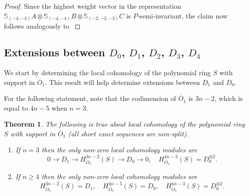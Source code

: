\documentclass[11pt,reqno]{amsart}
\newcommand{\oo}{\otimes}
\newcommand{\bS}{\mathbb{S}}
\newcommand{\ol}[1]{\overline{#1}}
\newtheorem{theorem}{Theorem}[section]
\numberwithin{equation}{section}
\begin{document}
\begin{proof}
Since the highest weight vector in the representation $\bS_{(-4,-4)}A\oo \bS_{(-4,-4)}B\oo \bS_{(-2,-3,-3)}C$ is $P$-semi-invariant, the claim now follows analogously to \cite[Lemma 3.12 and Proposition 3.14]{lHorincz2019categories} %
\end{proof}



\subsection{Extensions between $D_0$, $D_1$, $D_2$, $D_3$, $D_4$} 



We start by determining the local cohomology of the polynomial ring $S$ with support in $\ol{O}_1$. This result will help determine extensions between $D_1$ and $D_0$.

For the following statement, note that the codimension of $\ol{O}_1$ is $3n-2$, which is equal to $4n-5$ when $n=3$.

\begin{theorem}\label{BettiThm}
The following is true about local cohomology of the polynomial ring $S$ with support in $\ol{O}_1$ (all short exact sequences are non-split).

\begin{enumerate}	
\item If $n=3$ then the only non-zero local cohomology modules are 
$$
0 \to D_1 \to H^{3n-2}_{\ol{O}_1}(S)\to D_0\to 0,\quad H^{4n-3}_{\ol{O}_1}(S)=D_0^{\oplus 2}.
$$
\item If $n\geq 4$ then the only non-zero local cohomology modules are
$$
H^{3n-2}_{\ol{O}_1}(S)=D_1,\quad H^{4n-5}_{\ol{O}_1}(S)=D_0,\quad H^{4n-3}_{\ol{O}_1}(S)=D_0^{\oplus 2}.
$$
\end{enumerate}
	
\end{theorem}
\end{document}
